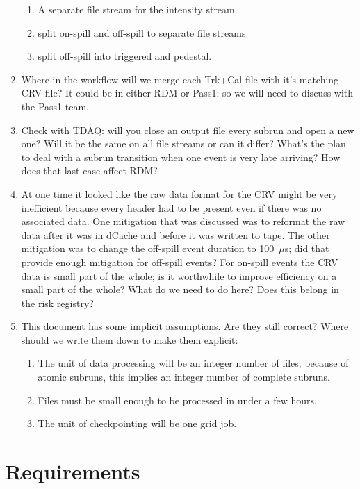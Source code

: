 \begin{enumerate}
\begin{enumerate}
      \item A separate file stream for the intensity stream.
      \item split on-spill and off-spill to separate file streams
      \item split off-spill into triggered and pedestal.
    \end{enumerate}
  \item Where in the workflow will we merge each Trk+Cal file with it's matching CRV file?
    It could be in either RDM or Pass1; so we will need to discuss with the Pass1 team.
  \item Check with TDAQ: will you close an output file every subrun and open a new one? Will it be the same
    on all file streams or can it differ?  What's the plan to deal with a subrun transition when one
    event is very late arriving?  How does that last case affect RDM?
  \item At one time it looked like the raw data format for the CRV might be very inefficient
    because every header had to be present even if there was no associated data.
    One mitigation that was discussed was to reformat the raw data after it was in dCache and before it was written to tape.
    The other mitigation was to change the off-spill event duration to 100~$\mu$s; did that provide enough mitigation for off-spill events?
    For on-spill events the CRV data is small part of the whole; is it worthwhile to improve efficiency on a small part of the whole?
    What do we need to do here?  Does this belong in the risk registry?
  \item This document has some implicit assumptions.  Are they still correct?  Where should we write them down to make them explicit:
    \begin{enumerate}
      \item The unit of data processing will be an integer number of files; because of atomic subruns, this implies an integer number
        of complete subruns.
      \item Files must be small enough to be processed in under a few hours.
      \item The unit of checkpointing will be one grid job.
    \end{enumerate}
\end{enumerate}


\chapter{Requirements}
\label{ch:requirements}

